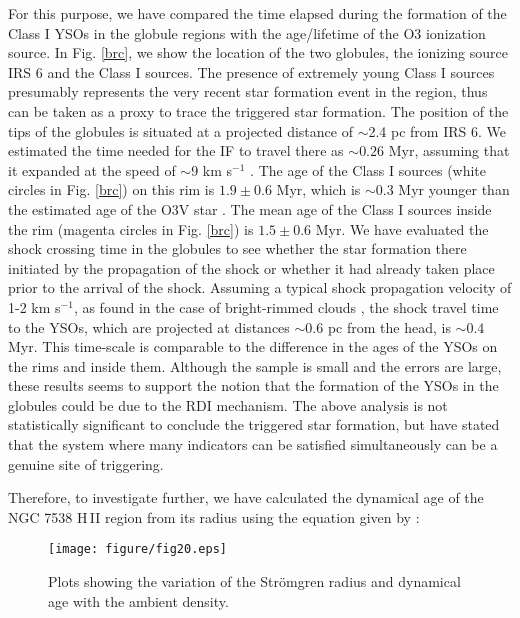 \documentclass[a4paper,fleqn,usenatbib,useAMS]{mnras}
\begin{document}
For this purpose, we have compared the time elapsed during the formation of the Class I YSOs  in the globule 
regions with the age/lifetime of the O3 ionization source.
In Fig. \ref{brc}, we show the location of the two globules, the ionizing source IRS 6 and the Class I sources.
The presence of extremely young Class I sources presumably represents the 
very recent star formation event in the region,
thus can be taken as a proxy to trace the triggered star formation.
The position of the tips of the globules is situated at a 
projected distance of $\sim$2.4 pc from IRS 6. 
We estimated the time needed for the IF to travel there 
as $\sim0.26$ Myr, assuming that it expanded at
the speed of $\sim$9 km s$^{-1}$ \citep[see, e.g.,][]{1976RMxAA...1..373P}.
The age of the Class I sources (white circles in Fig. \ref{brc}) on this rim is  $1.9\pm0.6$ Myr,
which is $\sim$0.3 Myr younger than the estimated age of the O3V star \citep[$\sim$2.2 Myr, cf.][]{2010A&A...517A...2P}.
The mean age of the Class I sources inside the rim (magenta circles in Fig. \ref{brc}) is $1.5\pm0.6$ Myr. 
We have evaluated the shock crossing time in the globules to see whether the star formation 
there initiated by the propagation of the shock or whether it had already taken place prior to the arrival of the shock.         
Assuming a typical shock propagation velocity of 1-2 km s$^{-1}$, as found in
the case of bright-rimmed clouds \citep[see, e.g.,][]{1999A&A...342..233W,2004A&A...414.1017T}, 
the shock travel time to the YSOs, which are projected at distances
$\sim$0.6 pc from the head, is $\sim0.4$ Myr.
This time-scale is comparable to the difference in the ages of the YSOs on the rims and inside them.
Although the sample is small and the errors are large, these results seems to support the notion that
the formation of the YSOs in the globules could be due to the RDI mechanism.
The above analysis is not statistically significant to conclude  the triggered star formation, 
but  \citet{2015MNRAS.450.1199D} have stated that the system where many indicators can be satisfied 
simultaneously can be a genuine site of triggering.

Therefore, to investigate further, we have calculated the dynamical age of the NGC 7538 H\,{\sevensize II} 
region from its radius using the equation given by \citet{1978ppim.book.....S}:

\begin{figure}
\centering\texttt{[image: figure/fig20.eps]}
\caption{\label{rs} Plots showing the variation of the Str\"omgren radius and dynamical age with the ambient density.
}
\end{figure}
\end{document}
